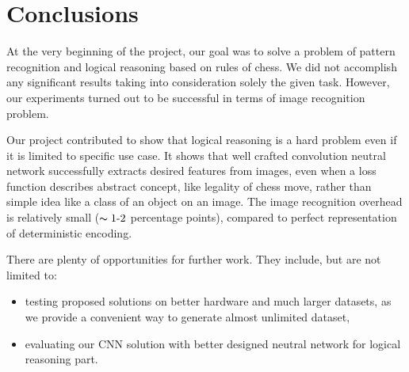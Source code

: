 \documentclass[10pt,twocolumn,letterpaper]{article}
\begin{document}
\section{Conclusions}

At the very beginning of the project, our goal was to solve a problem of pattern
recognition and logical reasoning based on rules of chess. We did not accomplish
any significant results taking into consideration solely the given task.
However, our experiments turned out to be successful in terms of image
recognition problem.

Our project contributed to show that logical reasoning is a hard problem even if
it is limited to specific use case. It shows that well crafted convolution
neutral network successfully extracts desired features from images, even when a
loss function describes abstract concept, like legality of chess move, rather
than simple idea like a class of an object on an image. The image recognition
overhead is relatively small ($\thicksim 1 \text{-} 2$ percentage points),
compared to perfect representation of deterministic encoding.

There are plenty of opportunities for further work. They include, but are not
limited to:
\begin{itemize}
\item testing proposed solutions on better hardware and much larger datasets, as
we provide a convenient way to generate almost unlimited dataset,
\item evaluating our CNN solution with better designed neutral network for
logical reasoning part.
\end{itemize}

{\small


}
\end{document}
